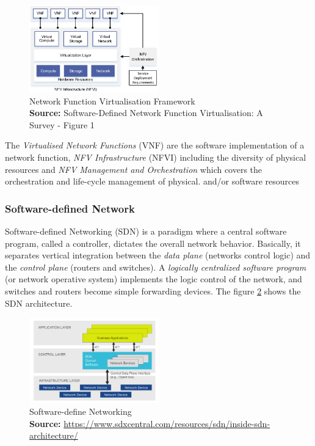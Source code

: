 \begin{figure}[!h]
\centering
\includegraphics[width=0.5\textwidth]{images/nfv_framework}
\caption[Network Function Virtualisation Framework]{Network Function Virtualisation Framework \\
\scriptsize{\textbf{Source:} Software-Defined Network Function
Virtualisation: A Survey - Figure 1}}
\label{nfv_framework}
\end{figure}

The \emph{Virtualised Network Functions} (VNF) are the software implementation of a network function, \emph{NFV Infrastructure} (NFVI) including the diversity of physical resources and \emph{NFV Management and Orchestration} which covers the orchestration and life-cycle management of physical.
and/or software resources 

\subsubsection{Software-defined Network} 
Software-defined Networking (SDN) is a paradigm where a central software program, called a controller, dictates the overall network behavior\cite{sdn}. Basically, it separates vertical integration between the \emph{data plane} (networks control logic) and the \emph{control plane} (routers and switches). A \emph{logically centralized software program}   (or network operative system) implements the logic control of the network, and switches and routers become  simple forwarding devices. The figure \ref{sdn} shows the SDN architecture.

\begin{figure}[!h]
\centering
\includegraphics[width=0.5\textwidth]{images/sdn_architecture}
\caption[Software-define Networking]{Software-define Networking \\
\scriptsize{\textbf{Source:} \url{https://www.sdxcentral.com/resources/sdn/inside-sdn-architecture/}}}
\label{sdn}
\end{figure}

